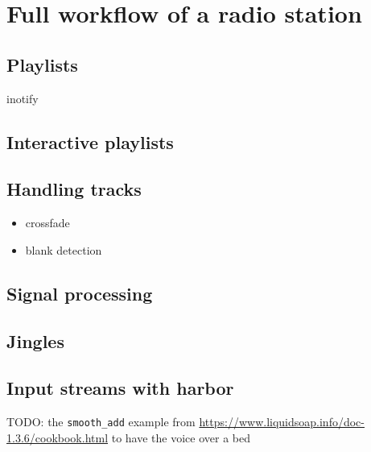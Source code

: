 \chapter{Full workflow of a radio station}
\section{Playlists}

inotify

\section{Interactive playlists}

\section{Handling tracks}
\begin{itemize}
\item crossfade
\item blank detection
\end{itemize}

\section{Signal processing}

\section{Jingles}

\section{Input streams with harbor}

TODO: the \verb|smooth_add| example from
\url{https://www.liquidsoap.info/doc-1.3.6/cookbook.html} to have the voice over
a bed

